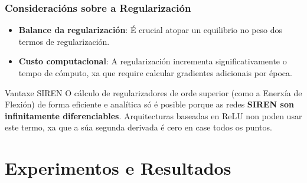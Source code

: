 \documentclass[xcolor=dvipsnames]{beamer}
\begin{document}
\begin{frame}
\frametitle{Consideracións sobre a Regularización}

\begin{itemize}
    \item \textbf{Balance da regularización}: É crucial atopar un equilibrio no peso dos termos de regularización.

    \vspace{0.4cm}
    \item \textbf{Custo computacional}: A regularización incrementa significativamente o tempo de cómputo, xa que require calcular gradientes adicionais por época.
\end{itemize}

\vfill

\begin{alertblock}{Vantaxe SIREN}
    O cálculo de regularizadores de orde superior (como a Enerxía de Flexión) de forma eficiente e analítica só é posible porque as redes \textbf{SIREN son infinitamente diferenciables}. Arquitecturas baseadas en ReLU non poden usar este termo, xa que a súa segunda derivada é cero en case todos os puntos.
\end{alertblock}


\end{frame}


\section{Experimentos e Resultados}
\end{document}
